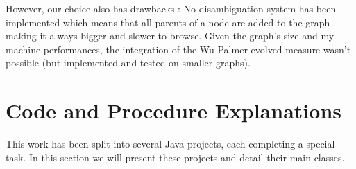 However, our choice also has drawbacks : No disambiguation system has been implemented which means that all parents of a node are added to the graph making it always bigger and slower to browse. Given the graph's size and my machine performances, the integration of the Wu-Palmer evolved measure wasn't possible (but implemented and tested on smaller graphs).

\section{Code and Procedure Explanations} %
\label{sec:code_and_procedure_explanations}
This work has been split into several Java projects, each completing a special task. In this section we will present these projects and detail their main classes.
